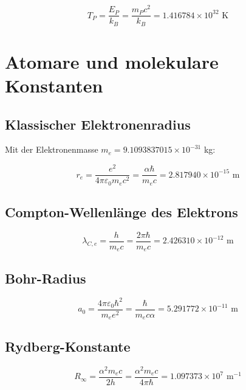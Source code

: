 	\begin{equation}
		T_P = \frac{E_P}{k_B} = \frac{m_P c^2}{k_B} = 1.416784 \times 10^{32} \text{ K}
	\end{equation}
	
	\section{Atomare und molekulare Konstanten}
	
	\subsection{Klassischer Elektronenradius}
	
	Mit der Elektronenmasse $m_e = 9.1093837015 \times 10^{-31}$ kg:
	
	\begin{equation}
		r_e = \frac{e^2}{4\pi\varepsilon_0 m_e c^2} = \frac{\alpha \hbar}{m_e c} = 2.817940 \times 10^{-15} \text{ m}
	\end{equation}
	
	\subsection{Compton-Wellenlänge des Elektrons}
	
	\begin{equation}
		\lambda_{C,e} = \frac{h}{m_e c} = \frac{2\pi\hbar}{m_e c} = 2.426310 \times 10^{-12} \text{ m}
	\end{equation}
	
	\subsection{Bohr-Radius}
	
	\begin{equation}
		a_0 = \frac{4\pi\varepsilon_0\hbar^2}{m_e e^2} = \frac{\hbar}{m_e c \alpha} = 5.291772 \times 10^{-11} \text{ m}
	\end{equation}
	
	\subsection{Rydberg-Konstante}
	
	\begin{equation}
		R_\infty = \frac{\alpha^2 m_e c}{2h} = \frac{\alpha^2 m_e c}{4\pi\hbar} = 1.097373 \times 10^7 \text{ m}^{-1}
	\end{equation}
	
